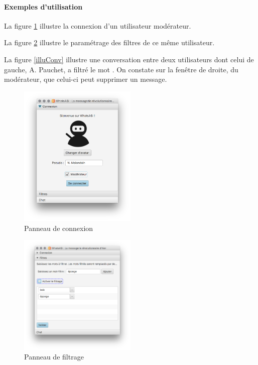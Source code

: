 \documentclass[11pt,dvipsnames,svgnames]{report}
\begin{document}
\paragraph*{Exemples d'utilisation}
La figure \ref{illuConn} illustre la connexion d'un utilisateur modérateur.

La figure \ref{illuFiltre} illustre le paramétrage des filtres de ce même utilisateur.

La figure \ref{illuConv} illustre une conversation entre deux utilisateurs dont celui de gauche, A. Pauchet, a filtré le mot  \fg{}. On constate sur la fenêtre de droite, du modérateur, que celui-ci peut supprimer un message.

\begin{figure}[H]
\caption{Panneau de connexion}
\label{illuConn}
\centerline{\includegraphics[width=0.5\textwidth]{images/illuConnexion.png}}
\end{figure}

\begin{figure}[H]
\caption{Panneau de filtrage}
\label{illuFiltre}
\centerline{\includegraphics[width=0.5\textwidth]{images/illuFiltres.png}}
\end{figure}
\end{document}
